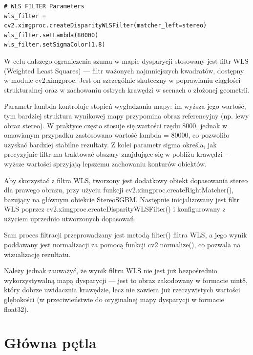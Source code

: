\documentclass[magisterska]{pracadypl}
\begin{document}
\begin{lstlisting}[style=mypython]
# WLS FILTER Parameters
wls_filter = cv2.ximgproc.createDisparityWLSFilter(matcher_left=stereo)
wls_filter.setLambda(80000)
wls_filter.setSigmaColor(1.8)
\end{lstlisting}

W celu dalszego ograniczenia szumu w mapie dysparycji stosowany jest filtr WLS (Weighted Least Squares) — filtr ważonych najmniejszych kwadratów, dostępny w module cv2.ximgproc. Jest on szczególnie skuteczny w poprawianiu ciągłości strukturalnej oraz w zachowaniu ostrych krawędzi w scenach o złożonej geometrii.

Parametr lambda kontroluje stopień wygładzania mapy: im wyższa jego wartość, tym bardziej struktura wynikowej mapy przypomina obraz referencyjny (np. lewy obraz stereo). W praktyce często stosuje się wartości rzędu 8000, jednak w omawianym przypadku zastosowano wartość lambda = 80000, co pozwoliło uzyskać bardziej stabilne rezultaty. Z kolei parametr sigma określa, jak precyzyjnie filtr ma traktować obszary znajdujące się w pobliżu krawędzi – wyższe wartości sprzyjają lepszemu zachowaniu konturów obiektów.

Aby skorzystać z filtra WLS, tworzony jest dodatkowy obiekt dopasowania stereo dla prawego obrazu, przy użyciu funkcji cv2.ximgproc.createRightMatcher(), bazujący na głównym obiekcie StereoSGBM. Następnie inicjalizowany jest filtr WLS poprzez cv2.ximgproc.\allowbreak createDisparityWLSFilter() i konfigurowany z użyciem uprzednio utworzonych dopasowań.

Sam proces filtracji przeprowadzany jest metodą filter() filtra WLS, a jego wynik poddawany jest normalizacji za pomocą funkcji cv2.normalize(), co pozwala na wizualizację rezultatu.

Należy jednak zauważyć, że wynik filtru WLS nie jest już bezpośrednio wykorzystywalną mapą dysparycji — jest to obraz zakodowany w formacie uint8, który dobrze uwidacznia krawędzie, lecz nie zawiera już rzeczywistych wartości głębokości (w przeciwieństwie do oryginalnej mapy dysparycji w formacie float32).

\section{Główna pętla}
\end{document}
